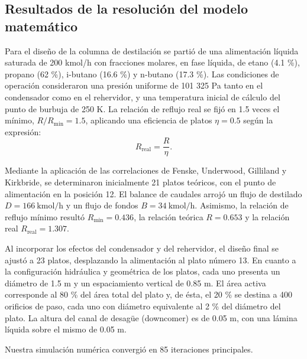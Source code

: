 \subsection{Resultados de la resolución del modelo matemático}
Para el diseño de la columna de destilación se partió de una alimentación líquida saturada de 200 kmol/h con fracciones molares, en fase líquida, de etano (4.1 \%), propano (62 \%), i-butano (16.6 \%) y n-butano (17.3 \%). Las condiciones de operación consideraron una presión uniforme de 101 325 Pa tanto en el condensador como en el rehervidor, y una temperatura inicial de cálculo del punto de burbuja de 250 K. La relación de reflujo real se fijó en 1.5 veces el mínimo, $R/R_{\mathrm{min}} = 1.5$, aplicando una eficiencia de platos $\eta = 0.5$ según la expresión:
$$
    R_{\mathrm{real}} = \frac{R}{\eta}.
$$

Mediante la aplicación de las correlaciones de Fenske, Underwood, Gilliland y Kirkbride, se determinaron inicialmente 21 platos teóricos, con el punto de alimentación en la posición 12. El balance de caudales arrojó un flujo de destilado $D = 166\ \text{kmol/h}$ y un flujo de fondos $B = 34\ \text{kmol/h}$. Asimismo, la relación de reflujo mínimo resultó $R_{\mathrm{min}} = 0.436$, la relación teórica $R = 0.653$ y la relación real $R_{\mathrm{real}} = 1.307$.
\bigskip

Al incorporar los efectos del condensador y del rehervidor, el diseño final se ajustó a 23 platos, desplazando la alimentación al plato número 13. En cuanto a la configuración hidráulica y geométrica de los platos, cada uno presenta un diámetro de 1.5 m y un espaciamiento vertical de 0.85 m. El área activa corresponde al 80 \% del área total del plato y, de ésta, el 20 \% se destina a 400 orificios de paso, cada uno con diámetro equivalente al 2 \% del diámetro del plato. La altura del canal de desagüe (downcomer) es de 0.05 m, con una lámina líquida sobre el mismo de 0.05 m.

\bigskip
Nuestra simulación numérica convergió en 85 iteraciones principales.

